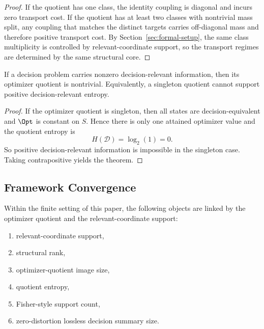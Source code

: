 \begin{proof}
If the quotient has one class, the identity coupling is diagonal and incurs zero transport cost. If the quotient has at least two classes with nontrivial mass split, any coupling that matches the distinct targets carries off-diagonal mass and therefore positive transport cost. By Section~\ref{sec:formal-setup}, the same class multiplicity is controlled by relevant-coordinate support, so the transport regimes are determined by the same structural core.
\end{proof}

\begin{theorem}\label{thm:nontriviality-counting}
If a decision problem carries nonzero decision-relevant information, then its optimizer quotient is nontrivial. Equivalently, a singleton quotient cannot support positive decision-relevant entropy.
\end{theorem}

\begin{proof}
If the optimizer quotient is singleton, then all states are decision-equivalent and $\Opt$ is constant on $S$. Hence there is only one attained optimizer value and the quotient entropy is
\[
H(\mathcal{D})=\log_2(1)=0.
\]
So positive decision-relevant information is impossible in the singleton case. Taking contrapositive yields the theorem.
\end{proof}

\subsection{Framework Convergence}

\begin{theorem}\label{thm:six-framework-recovery}
Within the finite setting of this paper, the following objects are linked by the optimizer quotient and the relevant-coordinate support:
\begin{enumerate}
\item relevant-coordinate support,
\item structural rank,
\item optimizer-quotient image size,
\item quotient entropy,
\item Fisher-style support count,
\item zero-distortion lossless decision summary size.
\end{enumerate}
\end{theorem}

